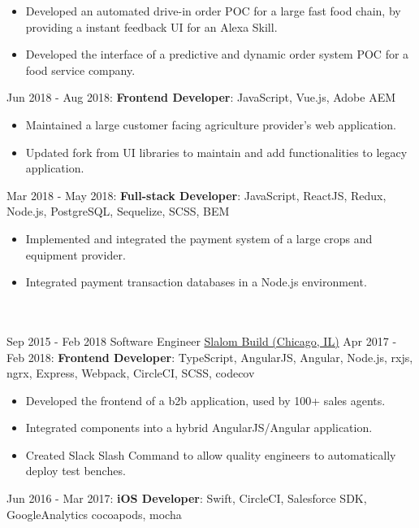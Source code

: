 \documentclass[letterpaper]{template} %
\begin{document}
\begin{twenty}
        {\begin{itemize}
            \item Developed an automated drive-in order POC for a large fast food chain, by providing a instant feedback UI for an Alexa Skill.
            \item Developed the interface of a predictive and dynamic order system POC for a food service company.
        \end{itemize}}
    \twentyitem
    	{}
		{}
        {}
        {}
        {Jun 2018 - Aug 2018: \textbf{Frontend Developer}: JavaScript, Vue.js, Adobe AEM}
        {\begin{itemize}
            \item Maintained a large customer facing agriculture provider's web application.
            \item Updated fork from UI libraries to maintain and add functionalities to legacy application.
        \end{itemize}}
    \twentyitem
    	{}
		{}
        {}
        {}
        {Mar 2018 - May 2018: \textbf{Full-stack Developer}: JavaScript, ReactJS, Redux, Node.js, PostgreSQL, Sequelize, SCSS, BEM}
        {\begin{itemize}
            \item Implemented and integrated the payment system of a large crops and equipment provider. 
            \item Integrated payment transaction databases in a Node.js environment.
        \end{itemize}}
    \\\divider\\
    \twentyitem
        {Sep 2015 - Feb 2018}
        {}
        {Software Engineer}
        {\href{https://www.slalom.com/}{Slalom Build (Chicago, IL)}}
        {Apr 2017 - Feb 2018: \textbf{Frontend Developer}: TypeScript, AngularJS, Angular, Node.js, rxjs, ngrx, Express, Webpack, CircleCI, SCSS, codecov}
        {\begin{itemize}
            \item Developed the frontend of a b2b application, used by 100+ sales agents.
            \item Integrated components into a hybrid AngularJS/Angular application.
            \item Created Slack Slash Command to allow quality engineers to automatically deploy test benches.
        \end{itemize}}
    \twentyitem
    	{}
		{}
        {}
        {}
        {Jun 2016 - Mar 2017: \textbf{iOS Developer}: Swift, CircleCI, Salesforce SDK, GoogleAnalytics cocoapods, mocha}

\end{twenty}
\end{document}
